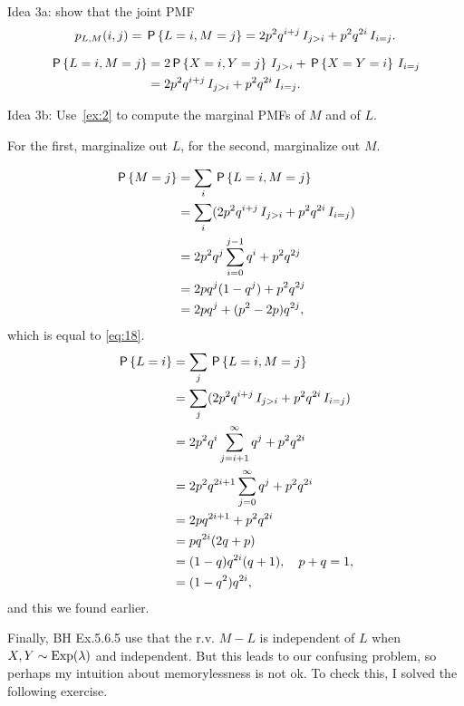\documentclass[a4paper,11pt]{article}
\begin{document}
\begin{exercise}\label{ex:2}
Idea 3a: show that  the  joint PMF
\begin{equation}
p_{L,M}(i,j) = \,\mathsf{P}\left\{L=i, M=j\right\} = 2p^{2}q^{i+j}\,I_{j>i}+ p^{2}q^{2i}\,I_{i=j}.
\end{equation}
\begin{solution}
  \begin{align}
    \label{eq:17}
\,\mathsf{P}\left\{L=i, M=j\right\}    
&= 2\,\mathsf{P}\left\{X=i, Y=j\right\}\,I_{j>i} + \,\mathsf{P}\left\{X=Y=i\right\}\,I_{i=j} \\
&= 2p^{2}q^{i+j}\,I_{j>i}+ p^{2}q^{2i}\,I_{i=j}.
  \end{align}
\end{solution}
\end{exercise}

\begin{exercise}\label{ex:8}
Idea 3b: Use~\cref{ex:2} to compute the marginal PMFs of $M$ and of $L$. 
\begin{hint}
For the first, marginalize out $L$, for the second, marginalize out $M$.
\end{hint}
\begin{solution}
  \begin{align}
\,\mathsf{P}\left\{M=j\right\}    
&= \sum_{i} \,\mathsf{P}\left\{L=i, M=j\right\} \\
 &= \sum_{i} (2p^{2}q^{i+j}\,I_{j>i}+ p^{2}q^{2i}\,I_{i=j}) \\
 &= 2p^2q^j\sum_{i=0}^{j-1} q^{i}+ p^{2}q^{2j} \label{eq:38}\\
 &= 2pq^j (1-q^{j})+ p^{2}q^{2j} \\
 &= 2pq^j + (p^{2}-2p) q^{2j},
  \end{align}
which is equal to \cref{eq:18}.
  \begin{align}
\,\mathsf{P}\left\{L=i\right\}    
&= \sum_{j} \,\mathsf{P}\left\{L=i, M=j\right\} \\
 &= \sum_{j} (2p^{2}q^{i+j}\,I_{j>i}+ p^{2}q^{2i}\,I_{i=j}) \\
 &= 2p^2q^i\sum_{j=i+1}^{\infty} q^{j}+ p^{2}q^{2i} \\
 &= 2p^{2}q^{2i+1} \sum_{j=0}^{\infty}q^{j}+ p^{2}q^{2i} \\
 &= 2pq^{2i+1} + p^{2} q^{2i}\\
 &= pq^{2i}(2q+p)\\
 &= (1-q)q^{2i}(q + 1), \quad p+q=1,\\
 &= (1-q^{2})q^{2i},
  \end{align}
and this we found earlier.
\end{solution}
\end{exercise}


Finally, BH Ex.5.6.5 use that the r.v.
$M-L$ is independent of $L$ when $X, Y\sim\mathrm{Exp}(\lambda)$ and independent.
But this leads to our confusing problem, so perhaps my intuition about memorylessness is not ok.
To check this, I solved  the following exercise.  
\end{document}
